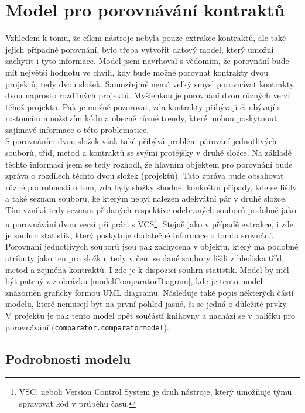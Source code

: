 	\section{Model pro porovnávání kontraktů}
		Vzhledem k tomu, že cílem nástroje nebyla pouze extrakce kontraktů, ale také jejich případné porovnání, bylo třeba vytvořit datový model, který umožní zachytit i tyto informace. Model jsem navrhoval s vědomím, že porovnání bude mít největší hodnotu ve chvíli, kdy bude možné porovnat kontrakty dvou projektů, tedy dvou složek. Samozřejmě nemá velký smysl porovnávat kontrakty dvou naprosto rozdílných projektů. Myšlenkou je porovnání dvou různých verzí téhož projektu. Pak je možné pozorovat, zda kontrakty přibývají či ubývají s rostoucím množstvím kódu a obecně různé trendy, které mohou poskytnout zajímavé informace o této problematice.\\ 
		
		S porovnáním dvou složek však také přibývá problém párování jednotlivých souborů, tříd, metod a kontraktů se svými protějšky v druhé složce. Na základě těchto informací jsem se tedy rozhodl, že hlavním objektem pro porovnání bude zpráva o rozdílech těchto dvou složek (projektů). Tato zpráva bude obsahovat různé podrobnosti o tom, zda byly složky shodné, konkrétní případy, kde se lišily a také seznam souborů, ke kterým nebyl nalezen adekvátní pár v druhé složce. Tím vzniká tedy seznam přidaných respektive odebraných souborů podobně jako u porovnávání dvou verzí při práci s VCS\footnote{VSC, neboli Version Control System je druh nástroje, který umožňuje týmu spravovat kód v průběhu času.}. Stejně jako v případě extrakce, i zde je souhrn statistik, který poskytuje dodatečné informace o tomto srovnání.\\
				
		Porovnání jednotlivých souborů jsou pak zachycena v objektu, který má podobné atributy jako ten pro složku, tedy v čem se dané soubory lišili z hlediska tříd, metod a zejména kontraktů. I zde je k dispozici souhrn statistik. Model by měl být patrný z z obrázku \ref{modelComparatorDiagram}, kde je tento model znázorněn graficky formou UML diagramu. Následuje také popis některých částí modelu, které nemusejí být na první pohled jasné, či se jedná o důležité prvky.\\
		
		V projektu je pak tento model opět součástí knihovny a nachází se v balíčku pro porovnávání (\texttt{comparator.comparatormodel}).
		
				\subsection{Podrobnosti modelu}
				
